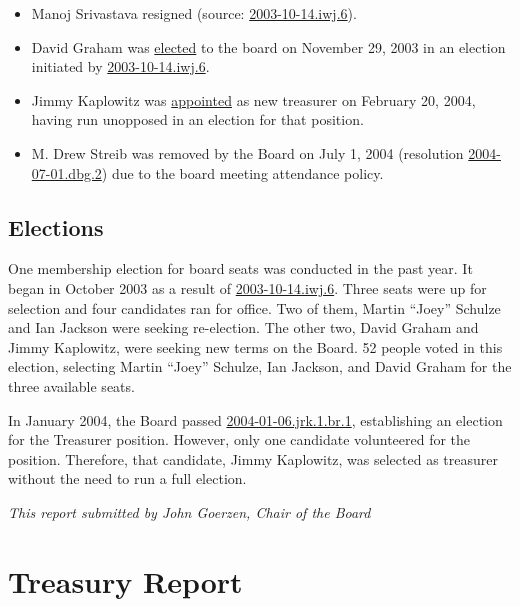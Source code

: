 \documentclass[letterpaper]{report}
\begin{document}
\begin{itemize}
\item Manoj Srivastava resigned (source: \href{http://www.spi-inc.org/corporate/resolutions/2003/2003-10-14.iwj.6}{2003-10-14.iwj.6}).
\item David Graham was \href{http://lists.spi-inc.org/pipermail/spi-announce/2003/000065.html}{elected}
to the board on November 29, 2003 in an election initiated by \href{http://www.spi-inc.org/corporate/resolutions/2003/2003-10-14.iwj.6}{2003-10-14.iwj.6}.
\item Jimmy Kaplowitz was \href{http://lists.spi-inc.org/pipermail/spi-announce/2004/000070.html}{appointed}
as new treasurer on February 20, 2004, having run unopposed in an
election for that position.
\item M. Drew Streib was removed by the Board on July 1, 2004 (resolution
\href{http://lists.spi-inc.org/pipermail/spi-announce/2004/000083.html}{2004-07-01.dbg.2})
due to the board meeting attendance policy.
\end{itemize}

\section{Elections}

One membership election for board seats was conducted in the past
year. It began in October 2003 as a result of \href{http://lists.spi-inc.org/pipermail/spi-announce/2003/000057.html}{2003-10-14.iwj.6}.
Three seats were up for selection and four candidates ran for office.
Two of them, Martin ``Joey'' Schulze and Ian Jackson were seeking
re-election. The other two, David Graham and Jimmy Kaplowitz, were
seeking new terms on the Board. 52 people voted in this election,
selecting Martin ``Joey'' Schulze, Ian Jackson, and David Graham
for the three available seats.

In January 2004, the Board passed \href{http://lists.spi-inc.org/pipermail/spi-announce/2004/000069.html}{2004-01-06.jrk.1.br.1},
establishing an election for the Treasurer position. However, only
one candidate volunteered for the position. Therefore, that candidate,
Jimmy Kaplowitz, was selected as treasurer without the need to run
a full election.

\emph{This report submitted by John Goerzen, Chair of the Board}


\chapter{Treasury Report}
\end{document}

